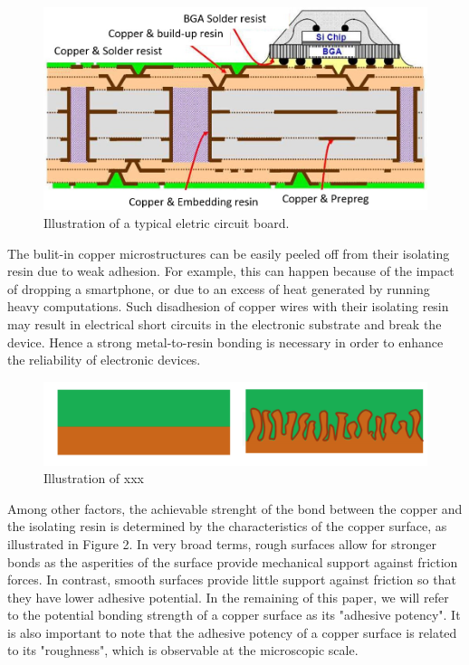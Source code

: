 \documentclass[10pt,twocolumn,letterpaper]{article}
\begin{document}
\begin{figure}[h]
\centering
\includegraphics[width=0.9\linewidth]{"./figures/Figure1"}
\caption{
Illustration of a typical eletric circuit board.
}
\end{figure}


The bulit-in copper microstructures can be easily peeled off from their isolating resin due to weak adhesion. For example, this can happen because of the impact of dropping a smartphone, or due to an excess of heat generated by running heavy computations.
Such disadhesion of copper wires with their isolating resin may result in electrical short circuits in the electronic substrate and break the device.
Hence a strong metal-to-resin bonding is necessary in order to enhance the reliability of electronic devices.

\begin{figure}[h]
	\centering
	\includegraphics[width=0.9\linewidth]{"./figures/Figure2"}
	\caption{
		Illustration of xxx
	}
\end{figure}

Among other factors, the achievable strenght of the bond between the copper and the isolating resin is determined by the characteristics of the copper surface, as illustrated in Figure 2. In very broad terms, rough surfaces allow for stronger bonds as the asperities of the surface provide mechanical support against friction forces. In contrast, smooth surfaces provide little support against friction so that they have lower adhesive potential. 
In the remaining of this paper, we will refer to the potential bonding strength of a copper surface as its "adhesive potency".
It is also important to note that the adhesive potency of a copper surface is related to its "roughness", which is observable at the microscopic scale.
\end{document}
